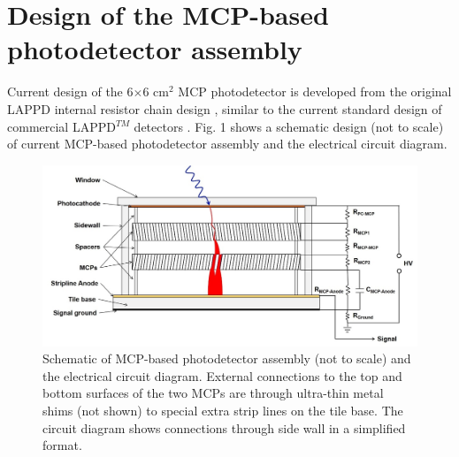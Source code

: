 \documentclass[preprint,5p]{elsarticle}
\begin{document}
\section{Design of the MCP-based photodetector assembly} \label{sec_design}
Current design of the 6$\times$6 cm$^2$ MCP photodetector is developed from the 
original LAPPD internal resistor chain design \cite{Wang-MCPs2}, similar to the 
current standard design of commercial LAPPD$^{TM}$ detectors 
\cite{Craven-MCPs}.  Fig.  1 shows a schematic design (not to scale) of current 
MCP-based photodetector assembly and the electrical circuit diagram.  
\begin{figure}[tbp]
\centering 
\includegraphics[scale=0.21]{fig/MCPs_design.png}
\caption{Schematic of MCP-based photodetector assembly (not to scale) and the 
   electrical circuit diagram. External connections to the top and bottom 
surfaces of the two MCPs are through ultra-thin metal shims (not shown) to 
special extra strip lines on the tile base. The circuit diagram shows 
connections through side wall in a simplified format.} \label{fig:design}
\end{figure}
\end{document}
